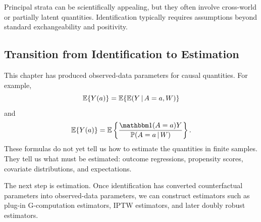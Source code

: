 Principal strata can be scientifically appealing, but they often involve cross-world or partially latent quantities. Identification typically requires assumptions beyond standard exchangeability and positivity.

\subsection{Transition from Identification to Estimation}

This chapter has produced observed-data parameters for causal quantities. For example,
\[
\mathbb{E}\{Y(a)\}
=
\mathbb{E}\{\mathbb{E}(Y\,\vert\, A=a,W)\}
\]
and
\[
\E\{\Ya{a}\}
=
\E\left\{
\frac{\ind(A=a)Y}{\Prob(A=a\given W)}
\right\}.
\]
These formulas do not yet tell us how to estimate the quantities in finite samples. They tell us what must be estimated: outcome regressions, propensity scores, covariate distributions, and expectations.

\begin{estimationbox}
The next step is estimation. Once identification has converted counterfactual parameters into observed-data parameters, we can construct estimators such as plug-in G-computation estimators, IPTW estimators, and later doubly robust estimators.
\end{estimationbox}
